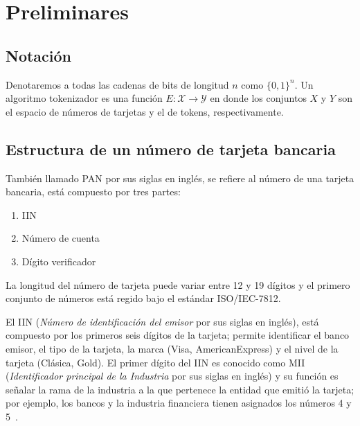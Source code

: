 %
%

\section{Preliminares}


\subsection{Notación}


Denotaremos a todas las cadenas de bits de longitud $ n $ como $ \{ 0, 1 \}^n $.
Un algoritmo tokenizador es una función $ E: \mathcal{X} \rightarrow
\mathcal{Y} $ en donde los conjuntos $ X $ y $ Y $ son el espacio de números de
tarjetas y el de tokens, respectivamente.

\subsection{Estructura de un número de tarjeta bancaria}
También llamado PAN por sus siglas en inglés, se refiere al número de una
tarjeta bancaria, está compuesto por tres partes:
  \begin{enumerate}
    \item IIN
    \item Número de cuenta
    \item Dígito verificador
  \end{enumerate}
  La longitud del número de tarjeta puede variar entre 12 y 19 dígitos y el
  primero conjunto de números está regido bajo el estándar ISO/IEC-7812.

  El IIN (\textit{Número de identificación del emisor} por sus siglas en
  inglés), está compuesto por los primeros seis dígitos de la tarjeta; permite
  identificar el banco emisor, el tipo de la tarjeta, la marca (Visa,
  AmericanExpress) y el nivel de la tarjeta (Clásica, Gold).  El primer dígito
  del IIN es conocido como MII (\textit{Identificador principal de la Industria}
  por sus siglas en inglés) y su función es señalar la rama de la industria a la
  que pertenece la entidad que emitió la tarjeta; por ejemplo, los bancos y la
  industria financiera tienen asignados los números 4 y 5~\cite{iso_7812}.

